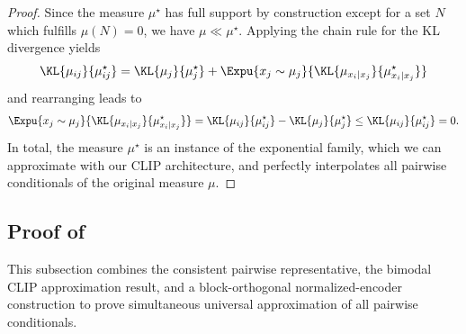 \documentclass{article}
\begin{document}
\begin{proof}
 Since the measure $\mu^\star$ has full support by construction except for a
 set $N$ which fulfills $\mu(N) = 0$, we have $\mu \ll \mu^\star$. Applying
 the chain rule for the KL divergence \cite[Thm.
  2.5.3]{coverELEMENTSINFORMATIONTHEORY} yields
 \begin{align*}
  \KL{\mu_{ij}}{\mu^\star_{ij}} = \KL{\mu_{j}}{\mu^\star_{j}}
  + \Expu{x_j \sim \mu_j}{\KL{\mu_{x_i\vert x_j}}{\mu^\star_{x_i\vert x_j}}}
 \end{align*}
 and rearranging leads to
 \begin{align*}
  \Expu{x_j \sim \mu_j}{\KL{\mu_{x_i\vert x_j}}{\mu^\star_{x_i\vert x_j}}}
  =
  \KL{\mu_{ij}}{\mu^\star_{ij}} - \KL{\mu_{j}}{\mu^\star_{j}}
  \leq  \KL{\mu_{ij}}{\mu^\star_{ij}}  = 0.
 \end{align*}
 In total, the measure $\mu^\star$ is an instance of the exponential family, which
 we can approximate with our CLIP architecture, and
 perfectly interpolates all pairwise conditionals of the original measure $\mu$.
\end{proof}



\subsection{Proof of }
\label{thm:UniversalApproxClipPairwiseConditionals-PROOF}

This subsection combines the consistent pairwise representative, the
 bimodal CLIP approximation result, and a block-orthogonal normalized-encoder
 construction to prove simultaneous universal approximation of all pairwise
 conditionals.
 
\end{document}

